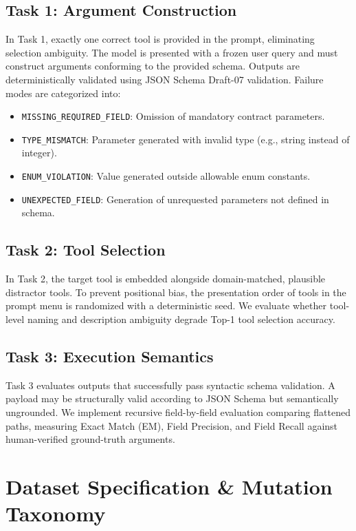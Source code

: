 \documentclass[10pt,conference]{IEEEtran}
\begin{document}
\subsection{Task 1: Argument Construction}
In Task 1, exactly one correct tool is provided in the prompt, eliminating selection ambiguity. The model is presented with a frozen user query and must construct arguments conforming to the provided schema. Outputs are deterministically validated using JSON Schema Draft-07 validation. Failure modes are categorized into:
\begin{itemize}
    \item \texttt{MISSING\_REQUIRED\_FIELD}: Omission of mandatory contract parameters.
    \item \texttt{TYPE\_MISMATCH}: Parameter generated with invalid type (e.g., string instead of integer).
    \item \texttt{ENUM\_VIOLATION}: Value generated outside allowable enum constants.
    \item \texttt{UNEXPECTED\_FIELD}: Generation of unrequested parameters not defined in schema.
\end{itemize}

\subsection{Task 2: Tool Selection}
In Task 2, the target tool is embedded alongside domain-matched, plausible distractor tools. To prevent positional bias, the presentation order of tools in the prompt menu is randomized with a deterministic seed. We evaluate whether tool-level naming and description ambiguity degrade Top-1 tool selection accuracy.

\subsection{Task 3: Execution Semantics}
Task 3 evaluates outputs that successfully pass syntactic schema validation. A payload may be structurally valid according to JSON Schema but semantically ungrounded. We implement recursive field-by-field evaluation comparing flattened paths, measuring Exact Match (EM), Field Precision, and Field Recall against human-verified ground-truth arguments.

\section{Dataset Specification \& Mutation Taxonomy}
\end{document}

